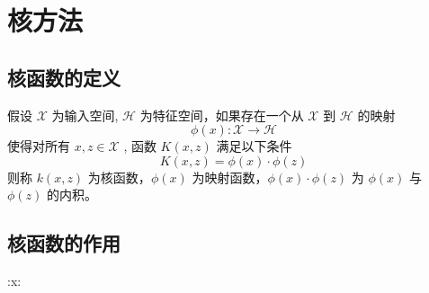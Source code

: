 \documentclass[11pt]{article}
\author{hyliu}
\date{\today}
\title{}
\begin{document}
\tableofcontents

\section{核方法}
\label{sec:orgd514c1f}
\subsection{核函数的定义}
\label{sec:org320cc98}
假设 \(\mathcal{X}\) 为输入空间, \(\mathcal{H}\) 为特征空间，如果存在一个从 \(\mathcal{X}\) 到 \(\mathcal{H}\) 的映射
$$\phi(x): \mathcal{X} \rightarrow \mathcal{H}$$
使得对所有 \(x, z \in \mathcal{X}\) , 函数 \(K(x, z)\) 满足以下条件
$$K(x, z) = \phi(x) \cdot \phi(z)$$
则称 \(k(x, z)\) 为核函数，\(\phi(x)\) 为映射函数，\(\phi(x) \cdot \phi(z)\) 为 \(\phi(x)\) 与 \(\phi(z)\) 的内积。
\subsection{核函数的作用}
\label{sec:orgbfad47a}
:x: 
\subsection{}
\label{sec:org275c200}
\end{document}

